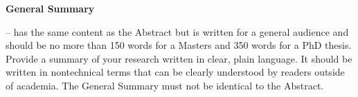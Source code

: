\begin{center}
\textbf{\large General Summary}
\end{center}


– has the same content as the Abstract but is written for a general audience and should
be no more than 150 words for a Masters and 350 words for a PhD thesis. Provide a
summary of your research written in clear, plain language. It should be written in nontechnical terms that can be clearly understood by readers outside of academia. The
General Summary must not be identical to the Abstract.